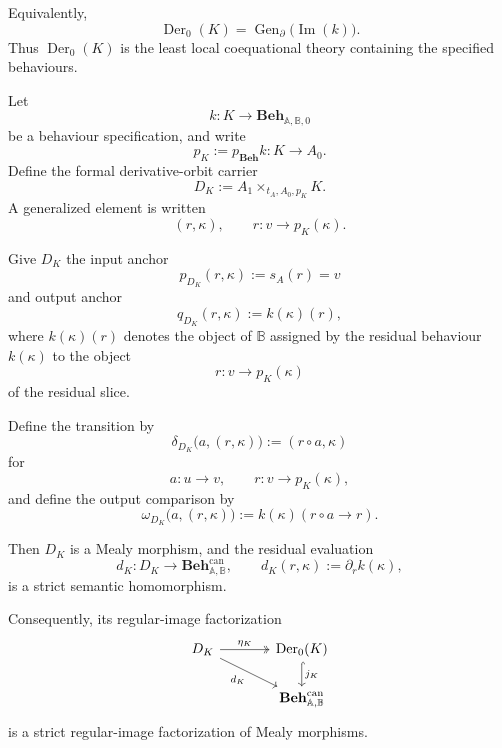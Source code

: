 Equivalently,
\[
    \operatorname{Der}_0(K)
    =
    \operatorname{Gen}_{\partial}
    \bigl(\operatorname{Im}(k)\bigr).
\]
Thus \(\operatorname{Der}_0(K)\) is the least local coequational theory
containing the specified behaviours.

\begin{proposition}
\label{prop:to-formal-derivative-orbit-presentation}
    Let
    \[
        k:K\to
        \mathbf{Beh}_{\mathbb A,\mathbb B,0}
    \]
    be a behaviour specification, and write
    \[
        p_K
        :=
        p_{\mathbf{Beh}}k:
        K\to A_0.
    \]
    Define the formal derivative-orbit carrier
    \[
        D_K
        :=
        A_1
        \times_{t_A,A_0,p_K}
        K.
    \]
    A generalized element is written
    \[
        (r,\kappa),
        \qquad
        r:v\to p_K(\kappa).
    \]

    Give \(D_K\) the input anchor
    \[
        p_{D_K}(r,\kappa):=s_A(r)=v
    \]
    and output anchor
    \[
        q_{D_K}(r,\kappa)
        :=
        k(\kappa)(r),
    \]
    where \(k(\kappa)(r)\) denotes the object of \(\mathbb B\) assigned by the
    residual behaviour \(k(\kappa)\) to the object
    \[
        r:v\to p_K(\kappa)
    \]
    of the residual slice.

    Define the transition by
    \[
        \delta_{D_K}
        \bigl(
            a,(r,\kappa)
        \bigr)
        :=
        (r\circ a,\kappa)
    \]
    for
    \[
        a:u\to v,
        \qquad
        r:v\to p_K(\kappa),
    \]
    and define the output comparison by
    \[
        \omega_{D_K}
        \bigl(
            a,(r,\kappa)
        \bigr)
        :=
        k(\kappa)(r\circ a\to r).
    \]

    Then \(D_K\) is a Mealy morphism, and the residual evaluation
    \[
        d_K:
        D_K\to
        \mathbf{Beh}^{\mathrm{can}}_{\mathbb A,\mathbb B},
        \qquad
        d_K(r,\kappa)
        :=
        \partial_rk(\kappa),
    \]
    is a strict semantic homomorphism.

    Consequently, its regular-image factorization
    \[
    \begin{tikzcd}[column sep=large]
        D_K
            \arrow[r, two heads, "\eta_K"]
            \arrow[dr, "d_K"']
        &
        \operatorname{Der}_0(K)
            \arrow[d, hook, "j_K"]
        \\
        &
        \mathbf{Beh}^{\mathrm{can}}_{\mathbb A,\mathbb B}
    \end{tikzcd}
    \]
    is a strict regular-image factorization of Mealy morphisms.
\end{proposition}

